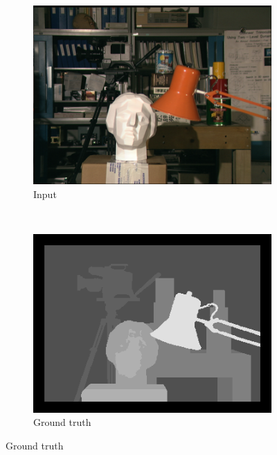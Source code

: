 \begin{figure}

  \setcounter{subfigure}{0}
  \label{fig:grid-of-outputs-tsukuba}
  \centering

  \begin{subfigure}[b]{0.45\textwidth}
    \centering
    \includegraphics[width=\textwidth]{images/stereo-pairs/tsukuba_imL.png}
    \caption{Input}
  \end{subfigure}
  ~
  \begin{subfigure}[b]{0.45\textwidth}
    \centering
    \includegraphics[width=\textwidth]{images/stereo-pairs/tsukuba_groundtruth.png}
    \caption{Ground truth}
  \end{subfigure}


\end{figure}
